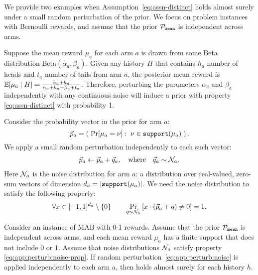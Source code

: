 We provide two examples when Assumption~\eqref{eq:assn-distinct} holds almost surely under a small random perturbation of the prior. We focus on problem instances with Bernoulli rewards, and assume that the prior $\mathcal{P}_\mathtt{mean}$ is independent across arms.



 Suppose the mean reward $\mu_a$ for each arm $a$ is drawn from some Beta distribution $\text{Beta}(\alpha_a, \beta_a)$. Given any history $H$ that contains $h_a$ number of heads and $t_a$ number of tails from arm $a$, the posterior mean reward is
    $\E[\mu_a \mid H] =  \frac{\alpha_a + h_a}{\alpha_a + h_a + \beta_a + t_a}$.
Therefore, perturbing the
    parameters $\alpha_a$ and $\beta_a$ independently with any
    continuous noise will induce a prior with property
    \eqref{eq:assn-distinct} with probability 1.  

 Consider the probability vector in the prior for arm $a$:
\[ \vec{p}_a = \left(\; \Pr[\mu_a=\nu]:\; \nu\in \mathtt{support}(\mu_a)\; \right).\]
We apply a small random perturbation independently to each such vector:
\begin{align}\label{eq:app:perturb:noise}
\vec{p}_a \leftarrow \vec{p}_a + \vec{q}_a,
    \quad \text{where}\quad \vec{q}_a\sim  \mathcal{N}_a.
\end{align}
Here $\mathcal{N}_a$ is the noise distribution for arm $a$: a distribution over real-valued, zero-sum vectors of dimension $d_a = |\mathtt{support}(\mu_a)|$. We need the noise distribution to satisfy the following property:
\begin{align}\label{eq:app:perturb:noise-prop}
\forall x\in [-1,1]^{d_a}\setminus \{0\}\qquad
\Pr_{q\sim \mathcal{N}_a}\left[ x\cdot(\vec{p}_a+ q) \neq 0 \right] =1.
\end{align}

\begin{theorem}\label{thm:perturb}
Consider an instance of MAB with 0-1 rewards. Assume that the prior $\mathcal{P}_\mathtt{mean}$ is independent across arms, and each mean reward $\mu_a$ has a finite support that does not include $0$ or $1$. Assume that noise distributions $\mathcal{N}_a$ satisfy property \eqref{eq:app:perturb:noise-prop}. If random perturbation~\eqref{eq:app:perturb:noise} is applied independently to each arm $a$, then  holds almost surely for each history $h$.
\end{theorem}


